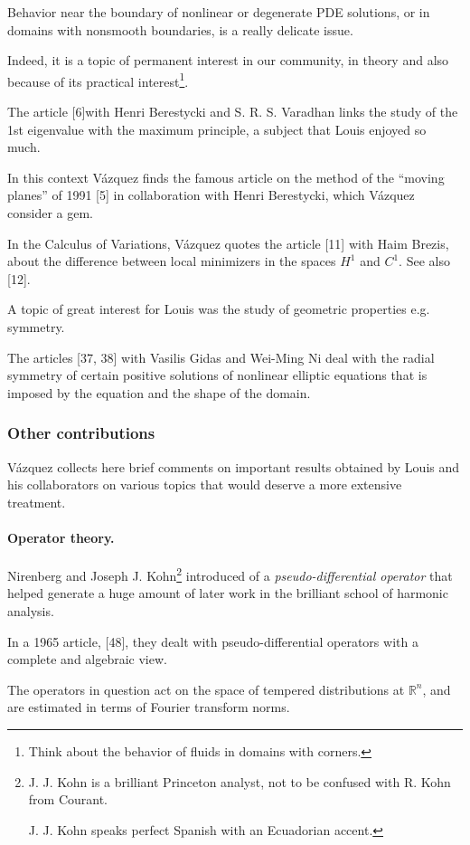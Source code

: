 \documentclass{article}
\begin{document}
Behavior near the boundary of nonlinear or degenerate PDE solutions, or in domains with nonsmooth boundaries, is a really delicate issue.

Indeed, it is a topic of permanent interest in our community, in theory and also because of its practical interest\footnote{Think about the behavior of fluids in domains with corners.}.

%
The article [6]with Henri Berestycki and S. R. S. Varadhan links the study of the 1st eigenvalue with the maximum principle, a subject that Louis enjoyed so much.

In this context V\'azquez finds the famous article on the method of the ``moving planes'' of 1991 [5] in collaboration with Henri Berestycki, which V\'azquez consider a gem.

%
In the Calculus of Variations, V\'azquez quotes the article [11] with Haim Brezis, about the difference between local minimizers in the spaces $H^1$ and $C^1$. See also [12].

%
A topic of great interest for Louis was the study of geometric properties e.g. symmetry.

The articles [37, 38] with Vasilis Gidas and Wei-Ming Ni deal with the radial symmetry of certain positive solutions of nonlinear elliptic equations that is imposed by the equation and the shape of the domain.

\subsubsection{Other contributions}
V\'azquez collects here brief comments on important results obtained by Louis and his collaborators on various topics that would deserve a more extensive treatment.

\paragraph{Operator theory.} Nirenberg and Joseph J. Kohn\footnote{J. J. Kohn is a brilliant Princeton analyst, not to be confused with R. Kohn from Courant.
	
	J. J. Kohn speaks perfect Spanish with an Ecuadorian accent.} introduced of a \textit{pseudo-differential operator} that helped generate a huge amount of later work in the brilliant school of harmonic analysis.

In a 1965 article, [48], they dealt with pseudo-differential operators with a complete and algebraic view.

The operators in question act on the space of tempered distributions at $\mathbb{R}^n$, and are estimated in terms of Fourier transform norms.
\end{document}
